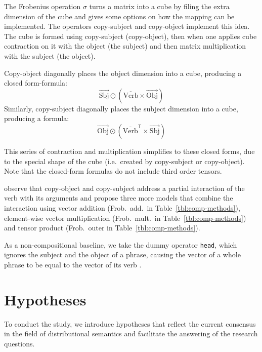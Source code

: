 The Frobenius operation $\sigma$ turns a matrix into a cube by filing the extra dimension of the cube and gives some options on how the mapping can be implemented. The operators copy-subject and copy-object \cite{kartsaklis-sadrzadeh-pulman:2012:POSTERS} implement this idea. The cube is formed using copy-subject (copy-object), then when one applies cube contraction on it with the object (the subject) and then matrix multiplication with the subject (the object).

Copy-object diagonally places the object dimension into a cube, producing a closed form-formula:
\begin{equation*}
  \overrightarrow{\text{Sbj}} \odot (\overline{\text{Verb}} \times \overrightarrow{\text{Obj}})
\end{equation*}
Similarly, copy-subject diagonally places the subject dimension into a cube, producing a formula:
\begin{equation*}
  \overrightarrow{\text{Obj}} \odot (\overline{\text{Verb}}^{\mathsf{T}} \times \overrightarrow{\text{Sbj}})
\end{equation*}

This series of contraction and multiplication simplifies to these closed forms, due to the special shape of the cube (i.e.~created by copy-subject or copy-object). Note that the closed-form formulas do not include third order tensors.

 observe that copy-object and copy-subject address a partial interaction of the verb with its arguments and propose three more models that combine the interaction using vector addition (Frob.~add.~in Table~\ref{tbl:comp-methods}), element-wise vector multiplication (Frob.~mult.~in Table~\ref{tbl:comp-methods}) and tensor product (Frob.~outer in Table~\ref{tbl:comp-methods}).

As a non-compositional baseline, we take the dummy operator \texttt{head}, which ignores the subject and the object of a phrase, causing the vector of a whole phrase to be equal to the vector of its verb \cite{milajevs-EtAl:2014:EMNLP2014}. 

\section{Hypotheses}
\label{sec:hypotheses}

To conduct the study, we introduce hypotheses that reflect the current consensus in the field of distributional semantics and facilitate the answering of the research questions.

